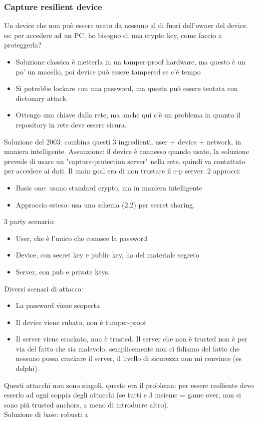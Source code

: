 \documentclass[16px]{article}
\begin{document}
\subsubsection{Capture resilient device}
Un device che non può essere usato da nessuno al di fuori dell'owner del device. es: per accedere ad un PC, ho bisogno di una crypto key, come faccio a proteggerla? 
\begin{itemize}
\item Soluzione classica è metterla in un tamper-proof hardware, ma questo è un po' un macello, poi device può essere tampered se c'è tempo 
\item Si potrebbe lockare con una password, ma questa può essere tentata con dictonary attack.
\item Ottengo una chiave dalla rete, ma anche qui c'è un problema in quanto il repository in rete deve essere sicura.
\end{itemize}
Soluzione del 2003: combina questi 3 ingredienti, user + device + network, in maniera intelligente. Assunzione: il device è  connesso quando usato, la soluzione prevede di usare un "capture-protection server" nella rete, quindi va contattato per accedere ai dati. Il main goal era di non trustare il c-p server. 2 approcci:
\begin{itemize}
\item Basic one: usano standard crypto, ma in maniera intelligente
\item Approccio esteso: usa uno schema (2,2) per secret sharing. 
\end{itemize}
3 party scenario:
\begin{itemize}
\item User, che è l'unico che conosce la password
\item Device, con secret key e public key, ha del materiale segreto
\item Server, con pub e private keys.
\end{itemize}
Diversi scenari di attacco:
\begin{itemize}
\item La password viene scoperta
\item Il device viene rubato, non è tumper-proof
\item Il server viene crackato, non è trusted. Il server che non è trusted non è per via del fatto che sia malevolo, semplicemente non ci fidiamo del fatto che nessuno possa crackare il server, il livello di sicurezza non mi convince (es delphi).
\end{itemize}
Questi attacchi non sono singoli, questo era il problema: per essere resiliente devo esserlo ad ogni coppia degli attacchi (se tutti e 3 insieme = game over, non si sono più trusted anchors, a meno di introdurre altro).\\ Soluzione di base: robusti a
\end{document}
